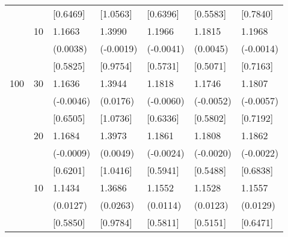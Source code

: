 \begin{table}[H]
{\begin{tabular}{c c | C{2.4cm} | C{2.4cm} | C{2.4cm} | C{2.4cm} | C{2.4cm} }
			&&[0.6469]&[1.0563]&[0.6396]&[0.5583]&[0.7840]\\
			&10&1.1663&1.3990&1.1966&1.1815&1.1968\\
			&&(0.0038)&(-0.0019)&(-0.0041)&(0.0045)&(-0.0014)\\
			&&[0.5825]&[0.9754]&[0.5731]&[0.5071]&[0.7163]\\
			\cmidrule(lr){1-7}
			100&30&1.1636&1.3944&1.1818&1.1746&1.1807\\
			&&(-0.0046)&(0.0176)&(-0.0060)&(-0.0052)&(-0.0057)\\
			&&[0.6505]&[1.0736]&[0.6336]&[0.5802]&[0.7192]\\
			&20&1.1684&1.3973&1.1861&1.1808&1.1862\\
			&&(-0.0009)&(0.0049)&(-0.0024)&(-0.0020)&(-0.0022)\\
			&&[0.6201]&[1.0416]&[0.5941]&[0.5488]&[0.6838]\\
			&10&1.1434&1.3686&1.1552&1.1528&1.1557\\
			&&(0.0127)&(0.0263)&(0.0114)&(0.0123)&(0.0129)\\
			&&[0.5850]&[0.9784]&[0.5811]&[0.5151]&[0.6471]\\
			\bottomrule[1.5pt]
	\end{tabular}}
	\label{table:table S.1}
\end{table}

